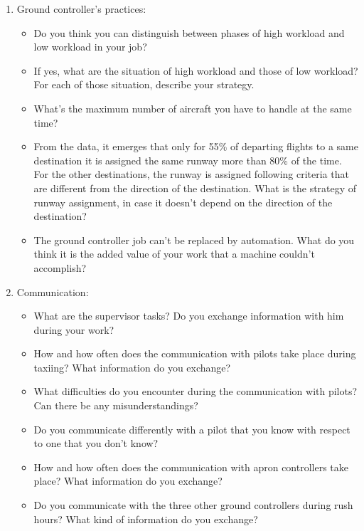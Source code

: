 \documentclass{article}
\begin{document}
\begin{enumerate}
\begin{itemize}
        \end{itemize}
    \item Ground controller's practices:
        \begin{itemize}
        	\item Do you think you can distinguish between phases of high workload and low workload in your job? 
        	\item If yes, what are the situation of high workload and those of low workload? For each of those situation, describe your strategy.
            \item What's the maximum number of aircraft you have to handle at the same time?
            \item From the data, it emerges that only for 55\% of departing flights to a same destination it is assigned the same runway more than 80\% of the time. For the other destinations, the runway is assigned following criteria that are different from the direction of the destination. What is the strategy of runway assignment, in case it doesn't depend on the direction of the destination?
            \item The ground controller job can't be replaced by automation. What do you think it is the added value of your work that a machine couldn't accomplish?
        \end{itemize}
    \item Communication:
        \begin{itemize}
            \item What are the supervisor tasks? Do you exchange information with him during your work?
            \item How and how often does the communication with pilots take place during taxiing? What information do you exchange? 
            \item What difficulties do you encounter during the communication with pilots? Can there be any misunderstandings?
            \item Do you communicate differently with a pilot that you know with respect to one that you don't know?
            \item How and how often does the communication with apron controllers take place? What information do you exchange?
            \item Do you communicate with the three other ground controllers during rush hours? What kind of information do you exchange?
        \end{itemize}
        

\end{enumerate}
\end{document}
